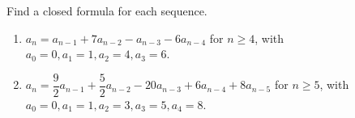 Find a closed formula for each sequence.
\begin{enumerate}
\item $a_n=a_{n-1}+7a_{n-2}-a_{n-3}-6a_{n-4}$ for $n\ge4$, with $a_0=0,a_1=1,a_2=4,a_3=6$.
\item $a_n=\dfrac{9}{2}a_{n-1}+\dfrac{5}{2}a_{n-2}-20a_{n-3}+6a_{n-4}+8a_{n-5}$ for $n\ge5$, with $a_0=0,a_1=1,a_2=3,a_3=5,a_4=8$.
\end{enumerate}
